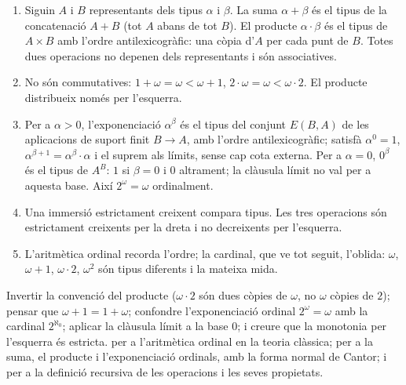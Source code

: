 \begin{resumcap}
\begin{enumerate}
  \item Siguin \(A\) i \(B\) representants dels tipus \(\alpha\) i \(\beta\). La suma \(\alpha+\beta\) és el tipus de la concatenació \(A+B\) (tot \(A\) abans de tot \(B\)). El producte \(\alpha\cdot\beta\) és el tipus de \(A\times B\) amb l'ordre antilexicogràfic: una còpia d'\(A\) per cada punt de \(B\). Totes dues operacions no depenen dels representants i són associatives.
  \item No són commutatives: \(1+\omega=\omega<\omega+1\), \(2\cdot\omega=\omega<\omega\cdot2\). El producte distribueix només per l'esquerra.
  \item Per a \(\alpha>0\), l'exponenciació \(\alpha^\beta\) és el tipus del conjunt \(E(B,A)\) de les aplicacions de suport finit \(B\to A\), amb l'ordre antilexicogràfic; satisfà \(\alpha^0=1\), \(\alpha^{\beta+1}=\alpha^\beta\cdot\alpha\) i el suprem als límits, sense cap cota externa. Per a \(\alpha=0\), \(0^\beta\) és el tipus de \(A^B\): \(1\) si \(\beta=0\) i \(0\) altrament; la clàusula límit no val per a aquesta base. Així \(2^\omega=\omega\) ordinalment.
  \item Una immersió estrictament creixent compara tipus. Les tres operacions són estrictament creixents per la dreta i no decreixents per l'esquerra.
  \item L'aritmètica ordinal recorda l'ordre; la cardinal, que ve tot seguit, l'oblida: \(\omega\), \(\omega+1\), \(\omega\cdot2\), \(\omega^2\) són tipus diferents i la mateixa mida.
\end{enumerate}
 Invertir la convenció del producte (\(\omega\cdot2\) són dues còpies de \(\omega\), no \(\omega\) còpies de \(2\)); pensar que \(\omega+1=1+\omega\); confondre l'exponenciació ordinal \(2^\omega=\omega\) amb la cardinal \(2^{\aleph_0}\); aplicar la clàusula límit a la base \(0\); i creure que la monotonia per l'esquerra és estricta.
 \cite[§§19--21]{halmos} per a l'aritmètica ordinal en la teoria clàssica; \cite[cap.~2]{jech2003} per a la suma, el producte i l'exponenciació ordinals, amb la forma normal de Cantor; i \cite[cap.~I.9]{kunen2011} per a la definició recursiva de les operacions i les seves propietats.
\end{resumcap}
